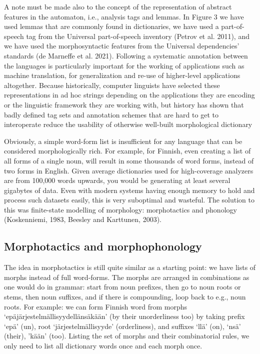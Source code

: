 \documentclass[free]{flammie}
\begin{document}
A note must be made also to the concept of the representation of abstract features in the
automaton, i.e., analysis tags and lemmas. In Figure 3 we have used lemmas that are
commonly found in dictionaries, we have used a part-of-speech tag from the Universal
part-of-speech inventory (Petrov et al. 2011), and we have used the morphosyntactic
features from the Universal dependencies' standards (de Marneffe et al. 2021). Following
a systematic annotation between the languages is particularly important for the working of
applications such as machine translation, for generalization and re-use of higher-level
applications altogether. Because historically, computer linguists have selected these
representations in ad hoc strings depending on the applications they are encoding or the
linguistic framework they are working with, but history has shown that badly defined tag
sets and annotation schemes that are hard to get to interoperate reduce the usability of
otherwise well-built morphological dictionary

Obviously, a simple word-form list is insufficient for any language that can be
considered morphologically rich. For example, for Finnish, even creating a list of all forms
of a single noun, will result in some thousands of word forms, instead of two forms in
English. Given average dictionaries used for high-coverage analyzers are from 100,000
words upwards, you would be generating at least several gigabytes of data. Even with
modern systems having enough memory to hold and process such datasets easily, this is
very suboptimal and wasteful. The solution to this was finite-state modelling of
morphology: morphotactics and phonology (Koskenniemi, 1983, Beesley and Karttunen,
2003).

\subsection{Morphotactics and morphophonology}

The idea in morphotactics is still quite similar as a starting point: we have lists of morphs
instead of full word-forms. The morphs are arranged in combinations as one would do in
grammar: start from noun prefixes, then go to noun roots or stems, then noun suffixes, and
if there is compounding, loop back to e.g., noun roots. For example: we can form Finnish
word from morphs ‘epäjärjestelmällisyydellänsäkään’ (by their unorderliness too) by
taking prefix ‘epä’ (un), root ‘järjestelmällisyyde’ (orderliness), and suffixes ‘llä’ (on),
‘nsä’ (their), ’kään’ (too). Listing the set of morphs and their combinatorial rules, we only
need to list all dictionary words once and each morph once.
\end{document}
